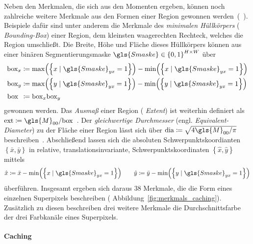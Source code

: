 Neben den Merkmalen, die sich aus den Momenten ergeben, können noch zahlreiche weitere Merkmale aus den Formen einer Region gewonnen werden~(\vgl{}~\cite{Siedhoff}).
Beispiele dafür sind unter anderem die Merkmale des \emph{minimalen Hüllkörpers} (\engl{} \emph{Bounding-Box}) einer Region, \dhe{} dem kleinsten waagerechten Rechteck, welches die Region umschließt.
Die Breite, Höhe und Fläche dieses Hüllkörpers können aus einer binären Segmentierungsmaske $\gls{Smaske} \in {\left\{0,1\right\}}^{H \times W}$ über
\begin{equation*}
\begin{split}
  \mathrm{box}_x & \coloneqq \max\left(\left\{x \mid \gls{Smaske}_{yx} = 1\right\}\right) - \min\left(\left\{x \mid \gls{Smaske}_{yx} = 1\right\}\right)\\
  \mathrm{box}_y & \coloneqq \max\left(\left\{y \mid \gls{Smaske}_{yx} = 1\right\}\right) - \min\left(\left\{y \mid \gls{Smaske}_{yx} = 1\right\}\right)\\
  \mathrm{box}_{\,\,\,} & \coloneqq \mathrm{box}_x \mathrm{box}_y
\end{split}
\end{equation*}
gewonnen werden.
Das \emph{Ausmaß} einer Region (\engl{} \emph{Extent}) ist weiterhin definiert als $\mathrm{ext} \coloneqq \gls{M}_{00}/\mathrm{box}$~\cite{Siedhoff}.
Der \emph{gleichwertige Durchmesser} (engl. \emph{Equivalent-Di\-a\-me\-ter}) zu der Fläche einer Region lässt sich über $\mathrm{dia} \coloneqq \sqrt{4 \gls{M}_{00}/\pi}$ beschreiben~\cite{Siedhoff}.
Abschließend lassen sich die absoluten Schwerpunktskoordianten $\left\{\bar{x}, \bar{y}\right\}$ in relative, \dhe{} translationsinvariante, Schwerpunktskoordinaten $\left\{\hat{x}, \hat{y}\right\}$ mittels
\begin{equation*}
  \hat{x} \coloneqq \bar{x} - \min\left(\left\{x \mid \gls{Smaske}_{yx} = 1\right\}\right)
  \qquad
  \hat{y} \coloneqq \bar{y} - \min\left(\left\{y \mid \gls{Smaske}_{yx} = 1\right\}\right)
\end{equation*}
überführen.
Insgesamt ergeben sich daraus $38$ Merkmale, die die Form eines einzelnen Superpixels beschreiben (\vgl{} Abbildung~\ref{fig:merkmals_caching}).
Zusätzlich zu diesen beschreiben drei weitere Merkmale die Durchschnittsfarbe der drei Farbkanäle eines Superpixels.

\paragraph{Caching}
\label{Caching}

